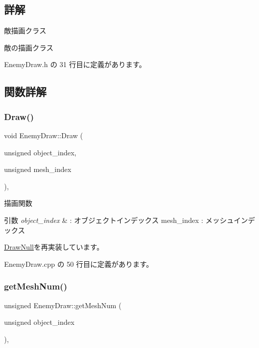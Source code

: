 \subsection{詳解}
敵描画クラス 

敵の描画クラス 

 Enemy\+Draw.\+h の 31 行目に定義があります。



\subsection{関数詳解}
\mbox{\label{class_enemy_draw_a20a23c1c5fd5e510d15e8ca27aabd821}} 
\subsubsection{\texorpdfstring{Draw()}{Draw()}}
{\footnotesize\ttfamily void Enemy\+Draw\+::\+Draw (\begin{DoxyParamCaption}\item[{unsigned}]{object\+\_\+index,  }\item[{unsigned}]{mesh\+\_\+index }\end{DoxyParamCaption})\hspace{0.3cm}{\ttfamily [override]}, {\ttfamily [virtual]}}



描画関数 


\begin{DoxyParams}{引数}
{\em object\+\_\+index} & \+: オブジェクトインデックス mesh\+\_\+index \+: メッシュインデックス \\
\hline
\end{DoxyParams}


\mbox{\hyperlink{class_draw_null_afe50f6fd820b18d673f70f048743f339}{Draw\+Null}}を再実装しています。



 Enemy\+Draw.\+cpp の 50 行目に定義があります。

\mbox{\label{class_enemy_draw_a1d8a943e4b625795bbd5ae614cc38ed1}} 
\subsubsection{\texorpdfstring{get\+Mesh\+Num()}{getMeshNum()}}
{\footnotesize\ttfamily unsigned Enemy\+Draw\+::get\+Mesh\+Num (\begin{DoxyParamCaption}\item[{unsigned}]{object\+\_\+index }\end{DoxyParamCaption})\hspace{0.3cm}{\ttfamily [override]}, {\ttfamily [virtual]}}



